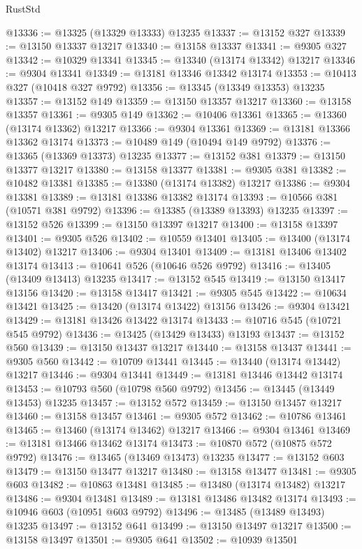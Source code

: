 \begin{lexlean}{RustStd}
\begin{coremodule}
@13336 := @13325 (@13329 @13333) @13235
@13337 := @13152 @327
@13339 := @13150 @13337 @13217
@13340 := @13158 @13337
@13341 := @9305 @327
@13342 := @10329 @13341
@13345 := @13340 (@13174 @13342) @13217
@13346 := @9304 @13341
@13349 := @13181 @13346 @13342 @13174
@13353 := @10413 @327 (@10418 @327 @9792)
@13356 := @13345 (@13349 @13353) @13235
@13357 := @13152 @149
@13359 := @13150 @13357 @13217
@13360 := @13158 @13357
@13361 := @9305 @149
@13362 := @10406 @13361
@13365 := @13360 (@13174 @13362) @13217
@13366 := @9304 @13361
@13369 := @13181 @13366 @13362 @13174
@13373 := @10489 @149 (@10494 @149 @9792)
@13376 := @13365 (@13369 @13373) @13235
@13377 := @13152 @381
@13379 := @13150 @13377 @13217
@13380 := @13158 @13377
@13381 := @9305 @381
@13382 := @10482 @13381
@13385 := @13380 (@13174 @13382) @13217
@13386 := @9304 @13381
@13389 := @13181 @13386 @13382 @13174
@13393 := @10566 @381 (@10571 @381 @9792)
@13396 := @13385 (@13389 @13393) @13235
@13397 := @13152 @526
@13399 := @13150 @13397 @13217
@13400 := @13158 @13397
@13401 := @9305 @526
@13402 := @10559 @13401
@13405 := @13400 (@13174 @13402) @13217
@13406 := @9304 @13401
@13409 := @13181 @13406 @13402 @13174
@13413 := @10641 @526 (@10646 @526 @9792)
@13416 := @13405 (@13409 @13413) @13235
@13417 := @13152 @545
@13419 := @13150 @13417 @13156
@13420 := @13158 @13417
@13421 := @9305 @545
@13422 := @10634 @13421
@13425 := @13420 (@13174 @13422) @13156
@13426 := @9304 @13421
@13429 := @13181 @13426 @13422 @13174
@13433 := @10716 @545 (@10721 @545 @9792)
@13436 := @13425 (@13429 @13433) @13193
@13437 := @13152 @560
@13439 := @13150 @13437 @13217
@13440 := @13158 @13437
@13441 := @9305 @560
@13442 := @10709 @13441
@13445 := @13440 (@13174 @13442) @13217
@13446 := @9304 @13441
@13449 := @13181 @13446 @13442 @13174
@13453 := @10793 @560 (@10798 @560 @9792)
@13456 := @13445 (@13449 @13453) @13235
@13457 := @13152 @572
@13459 := @13150 @13457 @13217
@13460 := @13158 @13457
@13461 := @9305 @572
@13462 := @10786 @13461
@13465 := @13460 (@13174 @13462) @13217
@13466 := @9304 @13461
@13469 := @13181 @13466 @13462 @13174
@13473 := @10870 @572 (@10875 @572 @9792)
@13476 := @13465 (@13469 @13473) @13235
@13477 := @13152 @603
@13479 := @13150 @13477 @13217
@13480 := @13158 @13477
@13481 := @9305 @603
@13482 := @10863 @13481
@13485 := @13480 (@13174 @13482) @13217
@13486 := @9304 @13481
@13489 := @13181 @13486 @13482 @13174
@13493 := @10946 @603 (@10951 @603 @9792)
@13496 := @13485 (@13489 @13493) @13235
@13497 := @13152 @641
@13499 := @13150 @13497 @13217
@13500 := @13158 @13497
@13501 := @9305 @641
@13502 := @10939 @13501

\end{coremodule}
\end{lexlean}
